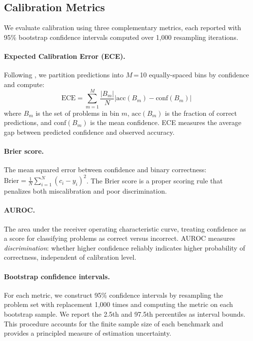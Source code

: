 \documentclass{article}
\begin{document}
\subsection{Calibration Metrics}
\label{sec:metrics}

We evaluate calibration using three complementary metrics, each reported with 95\% bootstrap confidence intervals computed over 1,000 resampling iterations.

\paragraph{Expected Calibration Error (ECE).}
Following \citet{naeini2015obtaining}, we partition predictions into $M$\,=\,10 equally-spaced bins by confidence and compute:
\begin{equation}
  \text{ECE} = \sum_{m=1}^{M} \frac{|B_m|}{N} \left| \text{acc}(B_m) - \text{conf}(B_m) \right|
  \label{eq:ece}
\end{equation}
where $B_m$ is the set of problems in bin $m$, $\text{acc}(B_m)$ is the fraction of correct predictions, and $\text{conf}(B_m)$ is the mean confidence. ECE measures the average gap between predicted confidence and observed accuracy.

\paragraph{Brier score.}
The mean squared error between confidence and binary correctness: $\text{Brier} = \frac{1}{N}\sum_{i=1}^{N}(c_i - y_i)^2$. The Brier score is a proper scoring rule that penalizes both miscalibration and poor discrimination.

\paragraph{AUROC.}
The area under the receiver operating characteristic curve, treating confidence as a score for classifying problems as correct versus incorrect. AUROC measures \emph{discrimination}: whether higher confidence reliably indicates higher probability of correctness, independent of calibration level.

\paragraph{Bootstrap confidence intervals.}
For each metric, we construct 95\% confidence intervals by resampling the problem set with replacement 1,000 times and computing the metric on each bootstrap sample. We report the 2.5th and 97.5th percentiles as interval bounds. This procedure accounts for the finite sample size of each benchmark and provides a principled measure of estimation uncertainty.
\end{document}
